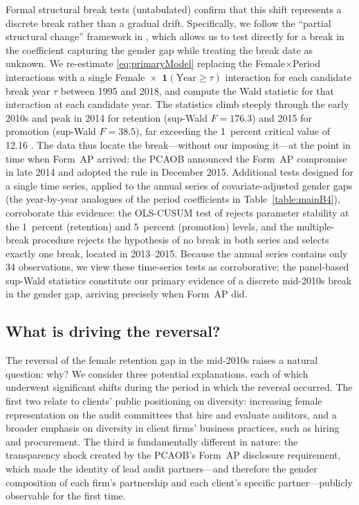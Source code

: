 \documentclass[11pt]{article}
\begin{document}
        Formal structural break tests (untabulated) confirm that this shift represents a discrete break rather than a gradual drift. Specifically, we follow the ``partial structural change'' framework in \textcite{andrewsTestsParameter1993}, which allows us to test directly for a break in the coefficient capturing the gender gap while treating the break date as unknown. We re-estimate \ref{eq:primaryModel} replacing the Female$\times$Period interactions with a single Female~$\times$~$\mathbf{1}(\mathrm{Year} \geq \tau)$ interaction for each candidate break year $\tau$ between 1995 and 2018, and compute the Wald statistic for that interaction at each candidate year. The statistics climb steeply through the early 2010s and peak in 2014 for retention (sup-Wald $F = 176.3$) and 2015 for promotion (sup-Wald $F = 38.5$), far exceeding the 1~percent critical value of 12.16 \parencite{andrewsTestsParameter1993}. The data thus locate the break---without our imposing it---at the point in time when Form~AP arrived: the PCAOB announced the Form~AP compromise in late 2014 and adopted the rule in December 2015. Additional tests designed for a single time series, applied to the annual series of covariate-adjusted gender gaps (the year-by-year analogues of the period coefficients in Table~\ref{table:mainB4}), corroborate this evidence: the OLS-CUSUM test of \textcite{plobergerCusumTest1992} rejects parameter stability at the 1~percent (retention) and 5~percent (promotion) levels, and the \textcite{baiEstimatingTesting1998} multiple-break procedure rejects the hypothesis of no break in both series and selects exactly one break, located in 2013--2015. Because the annual series contains only 34 observations, we view these time-series tests as corroborative; the panel-based sup-Wald statistics constitute our primary evidence of a discrete mid-2010s break in the gender gap, arriving precisely when Form~AP did.

    \subsection{What is driving the reversal?}\label{section:mechanisms}

        The reversal of the female retention gap in the mid-2010s raises a natural question: why? We consider three potential explanations, each of which underwent significant shifts during the period in which the reversal occurred. The first two relate to clients' public positioning on diversity: increasing female representation on the audit committees that hire and evaluate auditors, and a broader emphasis on diversity in client firms' business practices, such as hiring and procurement. The third is fundamentally different in nature: the transparency shock created by the PCAOB's Form~AP disclosure requirement, which made the identity of lead audit partners---and therefore the gender composition of each firm's partnership and each client's specific partner---publicly observable for the first time. 
\end{document}
